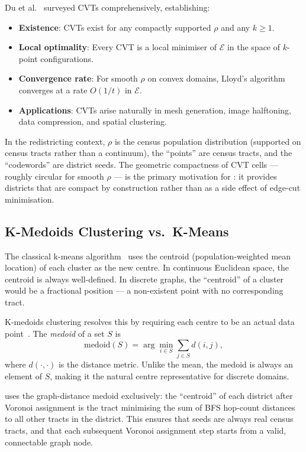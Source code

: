 Du et al.~\citeyear{du1999} surveyed CVTs comprehensively, establishing:
\begin{itemize}
\item \textbf{Existence}: CVTs exist for any compactly supported $\rho$ and
  any $k \ge 1$.
\item \textbf{Local optimality}: Every CVT is a local minimiser of
  $\mathcal{E}$ in the space of $k$-point configurations.
\item \textbf{Convergence rate}: For smooth $\rho$ on convex domains,
  Lloyd's algorithm converges at a rate $O(1/t)$ in $\mathcal{E}$.
\item \textbf{Applications}: CVTs arise naturally in mesh generation,
  image halftoning, data compression, and spatial clustering.
\end{itemize}

In the redistricting context, $\rho$ is the census population distribution
(supported on census tracts rather than a continuum), the ``points'' are
census tracts, and the ``codewords'' are district seeds.
The geometric compactness of CVT cells --- roughly circular for smooth $\rho$
--- is the primary motivation for \cvd{}: it provides districts that are
compact by construction rather than as a side effect of edge-cut minimisation.

\subsection{K-Medoids Clustering vs.\ K-Means}

The classical k-means algorithm~\citep{lloyd1982} uses the centroid
(population-weighted mean location) of each cluster as the new centre.
In continuous Euclidean space, the centroid is always well-defined.
In discrete graphs, the ``centroid'' of a cluster would be a fractional
position --- a non-existent point with no corresponding tract.

K-medoids clustering resolves this by requiring each centre to be an actual
data point~\citep{park2009}.
The \emph{medoid} of a set $S$ is
\[
  \mathrm{medoid}(S) = \arg\min_{i \in S} \sum_{j \in S} d(i,j),
\]
where $d(\cdot,\cdot)$ is the distance metric.
Unlike the mean, the medoid is always an element of $S$, making it the
natural centre representative for discrete domains.

\cvd{} uses the graph-distance medoid exclusively:
the ``centroid'' of each district after Voronoi assignment is the tract
minimising the sum of BFS hop-count distances to all other tracts in the
district.
This ensures that seeds are always real census tracts, and that each
subsequent Voronoi assignment step starts from a valid, connectable
graph node.

